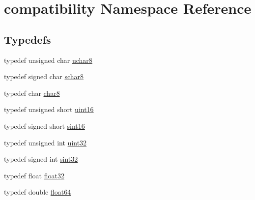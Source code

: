 \hypertarget{namespacecompatibility}{
\section{compatibility Namespace Reference}
\label{namespacecompatibility}
}
\subsection*{Typedefs}
\begin{DoxyCompactItemize}
\item 
typedef unsigned char \hyperlink{namespacecompatibility_a421e72ad468b7c7ffe74710a535b6ae0}{uchar8}
\item 
typedef signed char \hyperlink{namespacecompatibility_a97718d4c4d671d147c6367c4aa8eaaaf}{schar8}
\item 
typedef char \hyperlink{namespacecompatibility_a451d9cfd3da606a663aa298356f0b5a5}{char8}
\item 
typedef unsigned short \hyperlink{namespacecompatibility_a54e2a2e111c7b0fe9641fa7afbee071d}{uint16}
\item 
typedef signed short \hyperlink{namespacecompatibility_a55f18a31bf0e1572da9efb10a7b475fc}{sint16}
\item 
typedef unsigned int \hyperlink{namespacecompatibility_a51e8fe2956b4f39fe1fae96cec0d8393}{uint32}
\item 
typedef signed int \hyperlink{namespacecompatibility_afc3ea6dfbdda98c9d2615b235b140a18}{sint32}
\item 
typedef float \hyperlink{namespacecompatibility_a32a2d006ac2172c0f859370287f0104c}{float32}
\item 
typedef double \hyperlink{namespacecompatibility_ad1034b2c5db68564c02da8d500b21038}{float64}
\end{DoxyCompactItemize}



